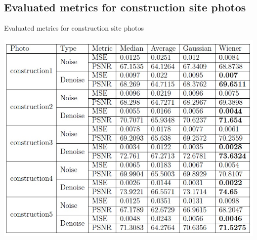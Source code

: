 \documentclass{beamer}
\begin{document}
\subsection{Evaluated metrics for construction site photos
}
\begin{frame}{Evaluated metrics for construction site photos
}
\begin{center}
\includegraphics{con1.jpg}


\end{center}
\end{frame}
\end{document}
